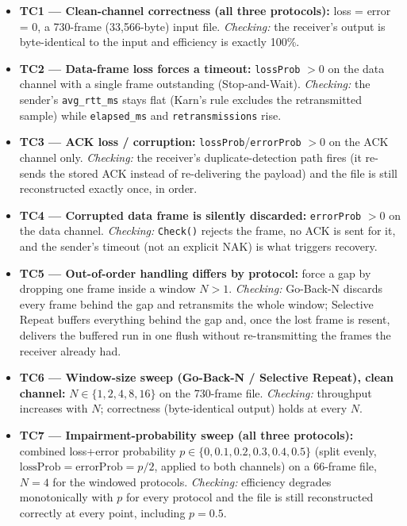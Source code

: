 \documentclass[11pt]{article}
\begin{document}
\begin{itemize}[leftmargin=1.6em]
  \item \textbf{TC1 --- Clean-channel correctness (all three protocols):} loss = error =
  0, a 730-frame (33{,}566-byte) input file. \emph{Checking:} the receiver's output is
  byte-identical to the input and efficiency is exactly 100\%.
  \item \textbf{TC2 --- Data-frame loss forces a timeout:} \texttt{lossProb} $>0$ on the
  data channel with a single frame outstanding (Stop-and-Wait). \emph{Checking:} the
  sender's \texttt{avg\_rtt\_ms} stays flat (Karn's rule excludes the retransmitted sample)
  while \texttt{elapsed\_ms} and \texttt{retransmissions} rise.
  \item \textbf{TC3 --- ACK loss / corruption:} \texttt{lossProb}/\texttt{errorProb} $>0$ on
  the ACK channel only. \emph{Checking:} the receiver's duplicate-detection path fires (it
  re-sends the stored ACK instead of re-delivering the payload) and the file is still
  reconstructed exactly once, in order.
  \item \textbf{TC4 --- Corrupted data frame is silently discarded:} \texttt{errorProb}
  $>0$ on the data channel. \emph{Checking:} \texttt{Check()} rejects the frame, no ACK is
  sent for it, and the sender's timeout (not an explicit NAK) is what triggers recovery.
  \item \textbf{TC5 --- Out-of-order handling differs by protocol:} force a gap by
  dropping one frame inside a window $N>1$. \emph{Checking:} Go-Back-N discards every frame
  behind the gap and retransmits the whole window; Selective Repeat buffers everything
  behind the gap and, once the lost frame is resent, delivers the buffered run in one flush
  without re-transmitting the frames the receiver already had.
  \item \textbf{TC6 --- Window-size sweep (Go-Back-N / Selective Repeat), clean channel:}
  $N \in \{1,2,4,8,16\}$ on the 730-frame file. \emph{Checking:} throughput increases with
  $N$; correctness (byte-identical output) holds at every $N$.
  \item \textbf{TC7 --- Impairment-probability sweep (all three protocols):} combined
  loss+error probability $p \in \{0, 0.1, 0.2, 0.3, 0.4, 0.5\}$ (split evenly,
  $\text{lossProb} = \text{errorProb} = p/2$, applied to both channels) on a 66-frame file,
  $N=4$ for the windowed protocols. \emph{Checking:} efficiency degrades monotonically with
  $p$ for every protocol and the file is still reconstructed correctly at every point,
  including $p=0.5$.

\end{itemize}
\end{document}
